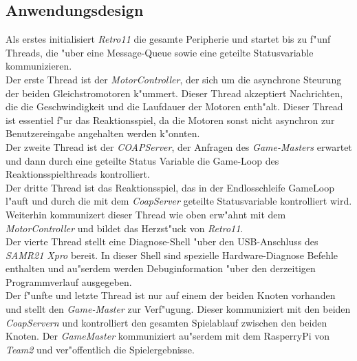 \documentclass[a4paper]{article}
\begin{document}
  \subsection{Anwendungsdesign}
    \label{sec:retro11_design}
    Als erstes initialisiert \textit{Retro11} die gesamte Peripherie und
    startet bis zu f"unf Threads, die "uber eine Message-Queue sowie eine
    geteilte Statusvariable kommunizieren.\\ Der erste Thread ist der
    \textit{MotorController}, der sich um die asynchrone Steurung der beiden
    Gleichstromotoren k"ummert. Dieser Thread akzeptiert Nachrichten, die die
    Geschwindigkeit und die Laufdauer der Motoren enth"alt. Dieser Thread ist
    essentiel f"ur das Reaktionsspiel, da die Motoren sonst nicht asynchron zur
    Benutzereingabe angehalten werden k"onnten.\\ Der zweite Thread ist der
    \textit{COAPServer}, der Anfragen des \textit{Game-Masters} erwartet und
    dann durch eine geteilte Status Variable die Game-Loop des
    Reaktionsspielthreads kontrolliert.\\ Der dritte Thread ist das
    Reaktionsspiel, das in der Endlosschleife GameLoop l"auft und durch die mit dem
    \textit{CoapServer} geteilte Statusvariable kontrolliert wird. Weiterhin
    kommunizert dieser Thread wie oben erw"ahnt mit dem
    \textit{MotorController} und bildet das Herzst"uck von \textit{Retro11}.\\
    Der vierte Thread stellt eine Diagnose-Shell "uber den USB-Anschluss des
    \textit{SAMR21 Xpro} bereit. In dieser Shell sind spezielle
    Hardware-Diagnose Befehle enthalten und au"serdem werden Debuginformation
    "uber den derzeitigen Programmverlauf ausgegeben.\\ Der f"unfte und letzte
    Thread ist nur auf einem der beiden Knoten vorhanden und stellt den
    \textit{Game-Master} zur Verf"ugung. Dieser kommuniziert mit den beiden
    \textit{CoapServern} und kontrolliert den gesamten Spielablauf zwischen den
    beiden Knoten. Der \textit{GameMaster} kommuniziert au"serdem mit dem
    RasperryPi von \textit{Team2} und ver"offentlich die Spielergebnisse.
\end{document}
